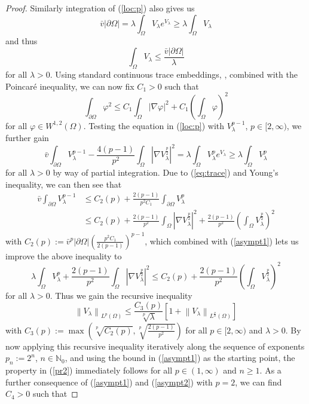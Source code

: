 \documentclass[12pt,a4paper]{amsart}
\theoremstyle{definition}
\theoremstyle{remark}
\numberwithin{equation}{section}
\numberwithin{theorem}{section}
\newcommand{\normA}[2][]{\left\lVert #2 \right\rVert_{#1}}
\begin{document}
\begin{proof}
Similarly integration of (\ref{loc:p}) also gives us 
$$
   \bar{v}|\partial \Omega| = \lambda\int_\Omega V_{\lambda}e^{V_{\lambda}} \geq \lambda \int_\Omega V_\lambda
$$ and thus 
\begin{equation}\label{asympt1}
  \int_\Omega V_\lambda\leq\frac{\bar{v}|\partial\Omega|}{\lambda}
\end{equation}
for all $\lambda > 0$. Using standard continuous trace embeddings, \cite[Theorem 5.5.1]{Evans}, combined with the Poincaré inequality, we can now fix $C_1 > 0$ such that 
\begin{equation}\label{eq:trace}
  \int_{\partial\Omega} \varphi^2 \leq C_1 \int_\Omega |\nabla \varphi|^2 + C_1\left(\int_\Omega \varphi \right)^2
\end{equation}
for all $\varphi \in W^{1,2}(\Omega)$. Testing the equation in (\ref{loc:p}) with $V^{p-1}_\lambda$, $p \in [2,\infty)$, we further gain
$$
  \bar{v}\int_{\partial \Omega} V_\lambda^{p-1} - \frac{4(p-1)}{p^2}\int_\Omega |\nabla V^\frac{p}{2}_\lambda|^2  = \lambda \int_\Omega V_\lambda^p e^{V_\lambda} \geq\lambda \int_\Omega V_\lambda^p
$$
for all $\lambda > 0$ by way of partial integration. Due to (\ref{eq:trace}) and Young's inequality, we can then see that  
$$
  \begin{aligned} 
  \bar{v}\int_{\partial \Omega} V^{p-1}_\lambda &\leq C_2(p) + \frac{2(p-1)}{p^2 C_1}\int_{\partial \Omega} V^p_\lambda  \\
  &\leq C_2(p) + \frac{2(p-1)}{p^2}\int_\Omega |\nabla V^\frac{p}{2}_\lambda|^2 + \frac{2(p-1)}{p^2} \left( \int_\Omega V^\frac{p}{2}_\lambda \right)^2
  \end{aligned}
$$
with $C_2(p) := \bar{v}^p|\partial\Omega|\left(\frac{p^2 C_1}{2(p-1)}\right)^{p-1}$, which combined with (\ref{asympt1}) lets us improve the above inequality to
\begin{equation}\label{asympt2}
\lambda \int_\Omega V^p_\lambda + \frac{2(p-1)}{p^2}\int_\Omega |\nabla V^\frac{p}{2}_\lambda|^2 \leq C_2(p) + \frac{2(p-1)}{p^2} \left( \int_\Omega V^\frac{p}{2}_\lambda \right)^2 
\end{equation}
for all $\lambda > 0$. Thus we gain the recursive inequality
\begin{equation*}
\normA[L^p(\Omega)]{V_\lambda} \leq \frac{C_3(p)}{\sqrt[p]{\lambda}} \left[ 1 + \normA[L^\frac{p}{2}(\Omega)]{V_\lambda} \right]
\end{equation*}
with $C_3(p) := \max\left(\sqrt[p]{C_2(p)}, \sqrt[p]{\frac{2(p-1)}{p^2}}\right)$ for all $p\in[2,\infty)$ and $\lambda > 0$. By now applying this recursive inequality iteratively along the sequence of exponents $p_n := 2^n$, $n \in \mathbb{N}_0$, and using the bound in (\ref{asympt1}) as the starting point, the property in (\ref{pr2}) immediately follows for all $p\in(1,\infty)$ and $n \geq 1$. As a further consequence of (\ref{asympt1}) and (\ref{asympt2}) with $p = 2$, we can find $C_4 > 0$ such that 

\end{proof}
\end{document}
